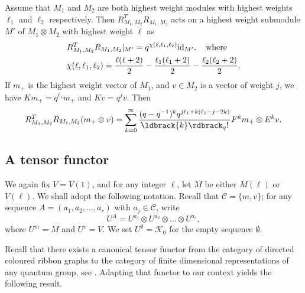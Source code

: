 \documentclass[12pt]{amsart}
\theoremstyle{definition}
\theoremstyle{remark}
\numberwithin{equation}{section}
\newcommand{\mc}{\mathcal}
\newcommand{\CK}{{\mathcal K}}
\newcommand{\id}{{\rm{id}}}
\newcommand{\cC}{\mc C}
\newcommand{\qint}[1]{\ldbrack{#1}\rdbrack_q }
\begin{document}
Assume that $M_1$ and $M_2$ are both highest weight modules with highest weights 
$\ell_1$ and $\ell_2$ respectively. Then $R^T_{M_1, M_2}R_{M_1, M_2}$ acts on a highest weight submodule 
$M'$ of $M_1\otimes M_2$  with highest weight $\ell$ as  
\begin{eqnarray}\label{eq:eigen}
\begin{aligned}
&R^T_{M_1, M_2}R_{M_1, M_2}|_{M'} =  q^{\chi(\ell, \ell_1, \ell_2)} \id_{M'}, \quad \text{where}\\
&\chi(\ell, \ell_1, \ell_2) = \frac{\ell(\ell+2)}{2} -\frac{\ell_1(\ell_1+2)}{2} - \frac{\ell_2(\ell_2+2)}{2}.
\end{aligned}
\end{eqnarray}
If $m_+$ is the highest weight vector of $M_1$, and $v\in M_2$ is a vector of weight $j$, we have
$Km_+=q^{\ell_1}m_+$ and $K v= q^j v$.  Then 
\begin{eqnarray}\label{eq:RtR}
R^T_{M_1, M_2}R_{M_1, M_2}(m_+\otimes v) =\sum_{k=0}^\infty\frac{(q-q^{-1})^k q^{ j \ell_1 
+k(\ell_1-j-2k)}}{\qint{k}!}F^k m_+\otimes E^k v.
\end{eqnarray}


%
%
\subsection{A tensor functor}
%
%

We again fix $V=V(1)$, and for any integer $\ell$, let $M$ be either $M(\ell)$ or $V(\ell)$. 
We shall adopt the following notation. Recall that $\cC=\{m, v\}$; for any sequence $A=(a_1, a_2, \dots, a_r)$ 
with $a_j\in\cC$, write
\[
U^A = U^{a_1}\otimes U^{a_2}\otimes \dots \otimes U^{a_r},
\]
where $U^m=M$ and $U^v=V$.
We set $U^\emptyset=\CK_0$ for the empty sequence $\emptyset$.


Recall that there exists a canonical tensor functor from the category of directed coloured ribbon 
graphs to the category of finite dimensional representations of any quantum group, see  \cite[Theorem 5.1]{RT}.  
Adapting that functor to our context yields the following result. 
\end{document}
